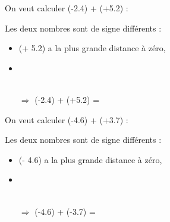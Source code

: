 \begin{myexs}
		On veut calculer (-\num{2.4}) + (+\num{5.2}) :
		
		Les deux nombres sont de signe différents :
		\begin{itemize}
			\item (+ \num{5.2}) a la plus grande distance à zéro, %
			\item \ %
			\\ \ %
			\item[$\Rightarrow$] (-\num{2.4}) + (+\num{5.2}) = %
		\end{itemize} 
		
		\vspace*{1cm}
		
		On veut calculer (-\num{4.6}) + (+\num{3.7}) :
		
		Les deux nombres sont de signe différents :
		\begin{itemize}
			\item (- \num{4.6}) a la plus grande distance à zéro, %
			\item \ %
			\\ \ %
			\item[$\Rightarrow$] (-\num{4.6}) + (-\num{3.7}) = %
		\end{itemize} 
\end{myexs}